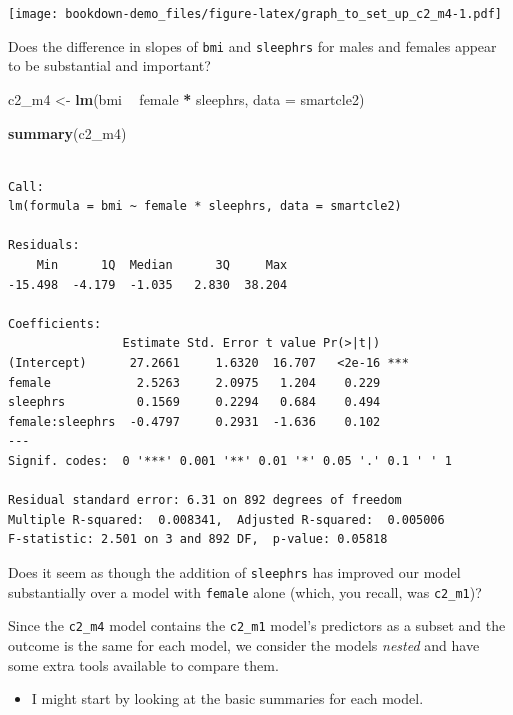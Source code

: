 \documentclass[]{book}
\newenvironment{Shaded}{\begin{snugshade}}{\end{snugshade}}
\newcommand{\KeywordTok}[1]{\textcolor[rgb]{0.13,0.29,0.53}{\textbf{#1}}}
\newcommand{\DataTypeTok}[1]{\textcolor[rgb]{0.13,0.29,0.53}{#1}}
\newcommand{\StringTok}[1]{\textcolor[rgb]{0.31,0.60,0.02}{#1}}
\newcommand{\OperatorTok}[1]{\textcolor[rgb]{0.81,0.36,0.00}{\textbf{#1}}}
\newcommand{\NormalTok}[1]{#1}
\providecommand{\tightlist}{%
  \setlength{\itemsep}{0pt}\setlength{\parskip}{0pt}}
\theoremstyle{definition}
\theoremstyle{definition}
\theoremstyle{definition}
\theoremstyle{remark}
\begin{document}
\texttt{[image: bookdown-demo\_files/figure-latex/graph\_to\_set\_up\_c2\_m4-1.pdf]}

Does the difference in slopes of \texttt{bmi} and \texttt{sleephrs} for
males and females appear to be substantial and important?

\begin{Shaded}
\begin{Highlighting}[]
\NormalTok{c2_m4 <-}\StringTok{ }\KeywordTok{lm}\NormalTok{(bmi }\OperatorTok{~}\StringTok{ }\NormalTok{female }\OperatorTok{*}\StringTok{ }\NormalTok{sleephrs, }\DataTypeTok{data =}\NormalTok{ smartcle2)}

\KeywordTok{summary}\NormalTok{(c2_m4)}
\end{Highlighting}
\end{Shaded}

\begin{verbatim}

Call:
lm(formula = bmi ~ female * sleephrs, data = smartcle2)

Residuals:
    Min      1Q  Median      3Q     Max 
-15.498  -4.179  -1.035   2.830  38.204 

Coefficients:
                Estimate Std. Error t value Pr(>|t|)    
(Intercept)      27.2661     1.6320  16.707   <2e-16 ***
female            2.5263     2.0975   1.204    0.229    
sleephrs          0.1569     0.2294   0.684    0.494    
female:sleephrs  -0.4797     0.2931  -1.636    0.102    
---
Signif. codes:  0 '***' 0.001 '**' 0.01 '*' 0.05 '.' 0.1 ' ' 1

Residual standard error: 6.31 on 892 degrees of freedom
Multiple R-squared:  0.008341,  Adjusted R-squared:  0.005006 
F-statistic: 2.501 on 3 and 892 DF,  p-value: 0.05818
\end{verbatim}

Does it seem as though the addition of \texttt{sleephrs} has improved
our model substantially over a model with \texttt{female} alone (which,
you recall, was \texttt{c2\_m1})?

Since the \texttt{c2\_m4} model contains the \texttt{c2\_m1} model's
predictors as a subset and the outcome is the same for each model, we
consider the models \emph{nested} and have some extra tools available to
compare them.

\begin{itemize}
\tightlist
\item
  I might start by looking at the basic summaries for each model.
\end{itemize}
\end{document}
